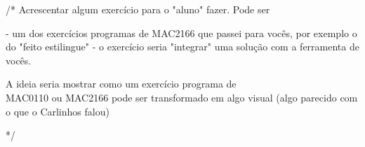 /*
Acrescentar algum exercício para o "aluno" fazer.
Pode ser

- um dos exercícios programas de MAC2166 que passei para
vocês, por exemplo o do "feito estilingue"
- o exercício seria "integrar" uma solução com a ferramenta de
vocês.

A ideia seria mostrar como um exercício programa de \\
MAC0110 ou MAC2166 pode ser transformado em algo visual (algo parecido com o que o Carlinhos falou)

*/

